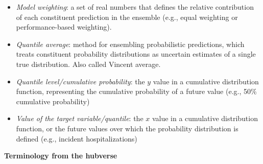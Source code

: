 \documentclass[
]{article}
\begin{document}
\begin{tcolorbox}
\begin{itemize}
\item
  \emph{Model weighting}: a set of real numbers that defines the
  relative contribution of each constituent prediction in the ensemble
  (e.g., equal weighting or performance-based weighting).
\item
  \emph{Quantile average}: method for ensembling probabilistic
  predictions, which treats constituent probability distributions as
  uncertain estimates of a single true distribution. Also called Vincent
  average.
\item
  \emph{Quantile level/cumulative probability}: the \(y\) value in a
  cumulative distribution function, representing the cumulative
  probability of a future value (e.g., 50\% cumulative probability)
\item
  \emph{Value of the target variable/quantile}: the \(x\) value in a
  cumulative distribution function, or the future values over which the
  probability distribution is defined (e.g., incident hospitalizations)
\end{itemize}

\textbf{Terminology from the hubverse}


\end{tcolorbox}
\end{document}
